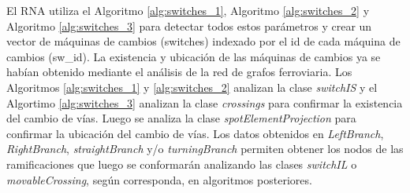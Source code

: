     El RNA utiliza el Algoritmo \ref{alg:switches_1}, Algoritmo \ref{alg:switches_2} y Algoritmo \ref{alg:switches_3} para detectar todos estos parámetros y crear un vector de máquinas de cambios (switches) indexado por el id de cada máquina de cambios (sw\_id). La existencia y ubicación de las máquinas de cambios ya se habían obtenido mediante el análisis de la red de grafos ferroviaria. Los Algoritmos \ref{alg:switches_1} y \ref{alg:switches_2}  analizan la clase \textit{switchIS} y el Algortimo \ref{alg:switches_3} analizan la clase \textit{crossings} para confirmar la existencia del cambio de vías. Luego se analiza la clase \textit{spotElementProjection} para confirmar la ubicación del cambio de vías. Los datos obtenidos en \textit{LeftBranch}, \textit{RightBranch}, \textit{straightBranch} y/o \textit{turningBranch} permiten obtener los nodos de las ramificaciones que luego se conformarán analizando las clases \textit{switchIL} o \textit{movableCrossing}, según corresponda, en algoritmos posteriores.

